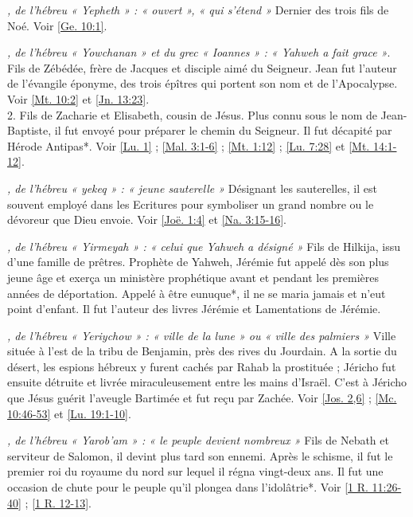 \begin{multicols}{2}
\textit{, de l'hébreu « Yepheth » : « ouvert », « qui s'étend »}\newline
Dernier des trois fils de Noé. Voir \vref{Ge. 10:1}.

\textit{, de l'hébreu « Yowchanan » et du grec « Ioannes » : « Yahweh a fait grace »}. Fils de Zébédée, frère de Jacques et disciple aimé du Seigneur. Jean fut l'auteur de l'évangile éponyme, des trois épîtres qui portent son nom et de l'Apocalypse. Voir \vref{Mt. 10:2} et \vref{Jn. 13:23}.
\\2. Fils de Zacharie et Elisabeth, cousin de Jésus. Plus connu sous le nom de Jean-Baptiste, il fut envoyé pour préparer le chemin du Seigneur. Il fut décapité par Hérode Antipas*. Voir \vref{Lu. 1} ; \vref{Mal. 3:1-6} ; \vref{Mt. 1:12} ; \vref{Lu. 7:28} et \vref{Mt. 14:1-12}.

\textit{, de l'hébreu « yekeq » : « jeune sauterelle »}\newline
Désignant les sauterelles, il est souvent employé dans les Ecritures pour symboliser un grand nombre ou le dévoreur que Dieu envoie. Voir \vref{Joë. 1:4} et \vref{Na. 3:15-16}.

\textit{, de l'hébreu « Yirmeyah » : « celui que Yahweh a désigné »}\newline
Fils de Hilkija, issu d'une famille de prêtres. Prophète de Yahweh, Jérémie fut appelé dès son plus jeune âge et exerça un ministère prophétique avant et pendant les premières années de déportation. Appelé à être eunuque*, il ne se maria jamais et n'eut point d'enfant. Il fut l'auteur des livres Jérémie et Lamentations de Jérémie.

\textit{, de l'hébreu « Yeriychow » : « ville de la lune » ou « ville des palmiers »}\newline
Ville située à l'est de la tribu de Benjamin, près des rives du Jourdain. A la sortie du désert, les espions hébreux y furent cachés par Rahab la prostituée ; Jéricho fut ensuite détruite et livrée miraculeusement entre les mains d'Israël. C'est à Jéricho que Jésus guérit l'aveugle Bartimée et fut reçu par Zachée. Voir \vref{Jos. 2,6} ; \vref{Mc. 10:46-53} et \vref{Lu. 19:1-10}.

\textit{, de l'hébreu « Yarob'am » : « le peuple devient nombreux »}\newline
Fils de Nebath et serviteur de Salomon, il devint plus tard son ennemi. Après le schisme, il fut le premier roi du royaume du nord sur lequel il régna vingt-deux ans. Il fut une occasion de chute pour le peuple qu'il plongea dans l'idolâtrie*. Voir \vref{1 R. 11:26-40} ; \vref{1 R. 12-13}.


\end{multicols}
